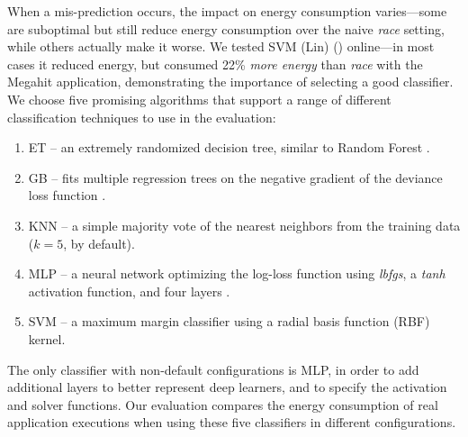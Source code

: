 When a mis-prediction occurs, the impact on energy consumption varies---some are suboptimal but still reduce energy consumption over the naive \emph{race} setting, while others actually make it worse.
We tested SVM (Lin) () online---in most cases it reduced energy, but consumed 22\% \emph{more energy} than \emph{race} with the Megahit application, demonstrating the importance of selecting a good classifier.
We choose five promising algorithms that support a range of different classification techniques to use in the evaluation:
\begin{enumerate}
\item ET -- an extremely randomized decision tree, similar to Random Forest \cite{Geurts2006ExtraTrees}.
\item GB -- fits multiple regression trees on the negative gradient of the deviance loss function \cite{scikit-learn, friedman2001GradientBoosting}.%
\item KNN -- a simple majority vote of the nearest neighbors from the training data ($k=5$, by default).
\item MLP -- a neural network optimizing the log-loss function using \emph{lbfgs}, a \emph{tanh} activation function, and four layers \cite{HintonMultiLayerPerceptron}.
\item SVM -- a maximum margin classifier using a radial basis function (RBF) kernel.
\end{enumerate}
The only classifier with non-default configurations is MLP, in order to add additional layers to better represent deep learners, and to specify the activation and solver functions.
Our evaluation compares the energy consumption of real application executions when using these five classifiers in different configurations.
